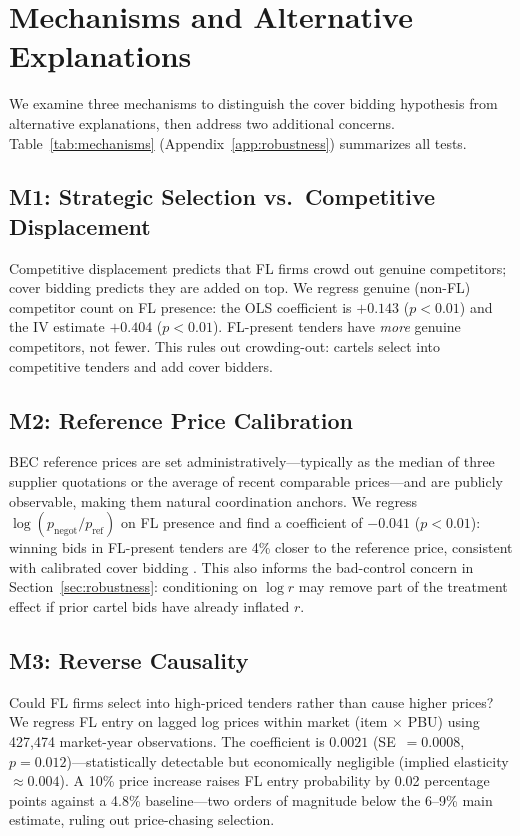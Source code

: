 \section{Mechanisms and Alternative Explanations}
\label{sec:mechanisms}

We examine three mechanisms to distinguish the cover bidding hypothesis
from alternative explanations, then address two additional concerns.
Table~\ref{tab:mechanisms} (Appendix~\ref{app:robustness}) summarizes
all tests.

\subsection{M1: Strategic Selection vs.\ Competitive Displacement}

Competitive displacement predicts that FL firms crowd out genuine
competitors; cover bidding predicts they are added on top. We regress
genuine (non-FL) competitor count on FL presence: the OLS coefficient
is $+0.143$ ($p < 0.01$) and the IV estimate $+0.404$ ($p < 0.01$).
FL-present tenders have \emph{more} genuine competitors, not fewer.
This rules out crowding-out: cartels select into competitive tenders
and add cover bidders.

\subsection{M2: Reference Price Calibration}

BEC reference prices are set administratively---typically as the median
of three supplier quotations or the average of recent comparable
prices---and are publicly observable, making them natural coordination
anchors. We regress $\log(p_{\text{negot}} / p_{\text{ref}})$ on FL
presence and find a coefficient of $-0.041$ ($p < 0.01$): winning bids
in FL-present tenders are 4\% closer to the reference price, consistent
with calibrated cover bidding \citep{marshall2012economics}. This also
informs the bad-control concern in Section~\ref{sec:robustness}:
conditioning on $\log r$ may remove part of the treatment effect if
prior cartel bids have already inflated $r$.

\subsection{M3: Reverse Causality}

Could FL firms select into high-priced tenders rather than cause higher
prices? We regress FL entry on lagged log prices within market
(item $\times$ PBU) using 427,474 market-year observations. The
coefficient is $0.0021$ (SE~$=0.0008$, $p = 0.012$)---statistically
detectable but economically negligible (implied elasticity $\approx
0.004$). A 10\% price increase raises FL entry probability by 0.02
percentage points against a 4.8\% baseline---two orders of magnitude
below the 6--9\% main estimate, ruling out price-chasing selection.

